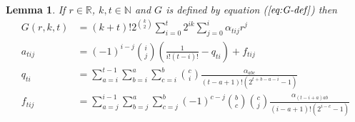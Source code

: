 \documentclass{article}
\newtheorem{lemma}{Lemma}
\begin{document}
\begin{lemma}
If $r \in \mathbb{R}$, $k, t \in \mathbb{N}$ and $G$ is defined by equation ($\textit{\ref{eq:G-def}}$) then
\begin{align}
\label{eq:lemma-3-G}
G(r, k, t)
&=
  (k+t)!2^{\binom{k}{2}}
  \sum_{i=0}^{t}
    2^{ik}
    \sum_{j=0}^{i}
      \alpha_{tij}
      r^j \\
\label{eq:alpha-definition}
a_{tij}
&=
  (-1)^{i-j}
  \binom{i}{j}
  \left(
    \frac{1}{i!(t-i)!}
    - q_{ti}
  \right)
  +f_{tij} \\
\label{eq:q-definition}
q_{ti}
&=
 \sum_{a=i}^{t-1}
   \sum_{b=i}^{a}
     \sum_{c=i}^{b}
       \binom{c}{i}
       \frac{\alpha_{abc}}{(t-a+1)!(2^{t+b-a-i}-1)} \\
\label{eq:f-definition}
f_{tij}
&=
  \sum_{a=j}^{i-1}
    \sum_{b=j}^{a}
      \sum_{c=j}^{b}
        (-1)^{c-j}
        \binom{b}{c}
        \binom{c}{j}
        \frac{\alpha_{(t-i+a)ab}}{(i-a+1)!(2^{i-c}-1)}
\end{align}
\end{lemma}
\end{document}
